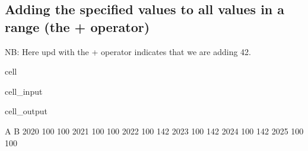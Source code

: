 \documentclass[letterpaper,10pt,english]{jupyterBook}
\begin{document}
\subsection{Adding  the specified  values to all values in a range (the + operator)}
\label{\detokenize{content/04_PythonEssentials/UpdateCommand:adding-the-specified-values-to-all-values-in-a-range-the-operator}}
\sphinxAtStartPar
NB: Here upd with the  + operator indicates that we are adding 42.

\begin{sphinxuseclass}{cell}\begin{sphinxVerbatimInput}

\begin{sphinxuseclass}{cell_input}
\begin{sphinxVerbatim}[commandchars=\\\{\}]
\end{sphinxVerbatim}

\end{sphinxuseclass}\end{sphinxVerbatimInput}
\begin{sphinxVerbatimOutput}

\begin{sphinxuseclass}{cell_output}
\begin{sphinxVerbatim}[commandchars=\\\{\}]
        A    B
2020  100  100
2021  100  100
2022  100  142
2023  100  142
2024  100  142
2025  100  100
\end{sphinxVerbatim}

\end{sphinxuseclass}\end{sphinxVerbatimOutput}

\end{sphinxuseclass}
\end{document}
